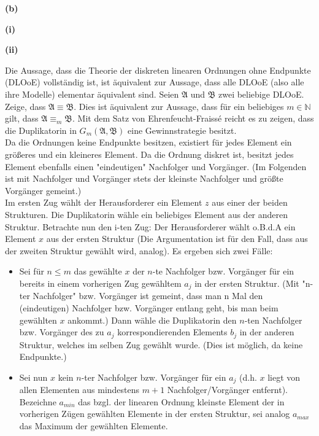 \documentclass[11pt, a4paper]{article}
\newcommand{\struc}[1]{\ensuremath{\mathfrak{#1}}}
\begin{document}
\textbf{(b)}
\begin{adjustwidth}{20pt}{20pt}
\textbf{(i)}
\begin{adjustwidth}{2em}{0em}\vspace{-\baselineskip}

\end{adjustwidth}
\textbf{(ii)}
\begin{adjustwidth}{2em}{0em}\vspace{-\baselineskip}
Die Aussage, dass die Theorie der diskreten linearen Ordnungen ohne Endpunkte (DLOoE) vollständig ist, ist äquivalent zur Aussage, dass alle DLOoE (also alle ihre Modelle) elementar
äquivalent sind. Seien $\struc{A}$ und $\struc{B}$ zwei beliebige DLOoE. Zeige, dass $\struc{A} \equiv \struc{B}$. Dies ist äquivalent zur Aussage, dass für ein beliebiges $m \in
\mathbb{N}$ gilt, dass $\struc{A} \equiv_m \struc{B}$. Mit dem Satz von Ehrenfeucht-Fraissé reicht es zu zeigen, dass die Duplikatorin in $G_m(\struc{A},\struc{B})$ eine Gewinnstrategie
besitzt.\\
Da die Ordnungen keine Endpunkte besitzen, existiert für jedes Element ein größeres und ein kleineres Element. Da die Ordnung diskret ist, besitzt jedes Element ebenfalls einen 
"eindeutigen" Nachfolger und Vorgänger. (Im Folgenden ist mit Nachfolger und Vorgänger stets der kleinste Nachfolger und größte Vorgänger gemeint.)\\
Im ersten Zug wählt der Herausforderer ein Element $z$ aus einer der beiden Strukturen. Die Duplikatorin wähle ein beliebiges Element aus der anderen Struktur. Betrachte nun den i-ten
Zug: Der Herausforderer wählt o.B.d.A ein Element $x$ aus der ersten Struktur (Die Argumentation ist für den Fall, dass aus der zweiten Struktur gewählt wird, analog). Es ergeben sich
zwei Fälle:
\begin{itemize}
\item Sei für $n \leq m$ das gewählte $x$ der $n$-te Nachfolger bzw. Vorgänger für ein bereits in einem vorherigen Zug gewähltem $a_j$ in der ersten Struktur. (Mit "n-ter Nachfolger"
bzw. Vorgänger ist gemeint, dass man n Mal den (eindeutigen) Nachfolger bzw. Vorgänger entlang geht, bis man beim gewählten $x$ ankommt.) Dann wähle die Duplikatorin den $n$-ten
Nachfolger bzw. Vorgänger des zu $a_j$ korrespondierenden Elements $b_j$ in der anderen Struktur, welches im selben Zug gewählt  wurde. (Dies ist möglich, da keine Endpunkte.)
\item Sei nun $x$ kein $n$-ter Nachfolger bzw. Vorgänger für ein $a_j$ (d.h. $x$ liegt von allen Elementen aus mindestens $m+1$ Nachfolger/Vorgänger entfernt). Bezeichne $a_{min}$ das bzgl. der linearen Ordnung kleinste Element der in vorherigen Zügen gewählten Elemente in der ersten Struktur, sei analog $a_{max}$ das Maximum der gewählten Elemente.

\end{itemize}
\end{adjustwidth}
\end{adjustwidth}
\end{document}
